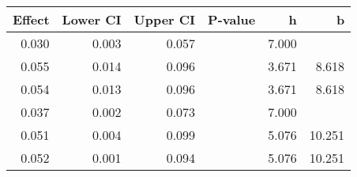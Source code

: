 \begin{table}[ht]
\centering
\begin{tabular}{rrrrrr}
  \hline
Effect & Lower CI & Upper CI & P-value & h & b \\ 
  \hline
0.030 & 0.003 & 0.057 &  & 7.000 &  \\ 
  0.055 & 0.014 & 0.096 &  & 3.671 & 8.618 \\ 
  0.054 & 0.013 & 0.096 &  & 3.671 & 8.618 \\ 
  0.037 & 0.002 & 0.073 &  & 7.000 &  \\ 
  0.051 & 0.004 & 0.099 &  & 5.076 & 10.251 \\ 
  0.052 & 0.001 & 0.094 &  & 5.076 & 10.251 \\ 
   \hline
\end{tabular}
\end{table}
